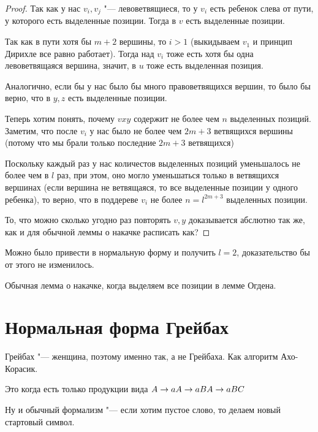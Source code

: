 \begin{proof}
Так как у нас $v_i, v_j$ "--- левоветвящиеся, то у $v_i$ есть ребенок слева от пути, у которого есть выделенные позиции. 
Тогда в $v$ есть выделенные позиции.

Так как в пути хотя бы $m + 2$ вершины, то $i > 1$ (выкидываем $v_1$ и принцип Дирихле все равно работает).
Тогда над $v_i$ тоже есть хотя бы одна левоветвящаяся вершина, значит, в $u$ тоже есть выделенная позиция.

Аналогично, если бы у нас было бы много правоветвящихся вершин, то было бы верно, что в $y, z$ есть выделенные позиции.

Теперь хотим понять, почему $vxy$ содержит не более чем $n$ выделенных позиций.
Заметим, что после $v_i$ у нас было не более чем $2m + 3$ ветвящихся вершины (потому что мы брали только последние $2m + 3$ ветвящихся)

Поскольку каждый раз у нас количестов выделенных позиций уменьшалось не более чем в $l$ раз, при этом, 
оно могло уменьшаться только в ветвящихся вершинах (если вершина не ветвящаяся, то все выделенные позиции у одного ребенка), то верно, что
в поддереве $v_i$ не более $n = l^{2m + 3}$ выделенных позиции.

То, что можно сколько угодно раз повторять $v, y$ доказывается абслютно так же, как и для обычной леммы о накачке \TODO расписать как?
\end{proof}
\begin{Rem}
Можно было привести в нормальную форму и получить $l = 2$, доказательство бы от этого не изменилось.
\end{Rem}
\begin{conseq}
Обычная лемма о накачке, когда выделяем все позиции в лемме Огдена.
\end{conseq}

\section{Нормальная форма Грейбах}
\begin{Rem}
Грейбах "--- женщина, поэтому именно так, а не Грейбаха. 
Как алгоритм Ахо-Корасик.
\end{Rem}

Это когда есть только продукции вида $\\
A \to a \\
A \to aB \\
A \to aBC$

Ну и обычный формализм "--- если хотим пустое слово, то делаем новый стартовый символ.

